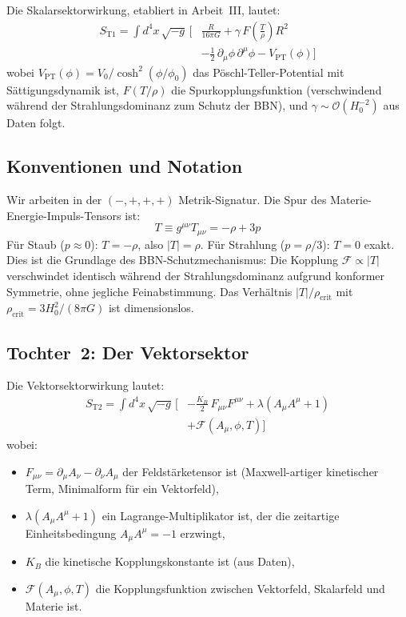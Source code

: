 \documentclass[aps,prd,twocolumn,superscriptaddress,nofootinbib]{revtex4-2}
\begin{document}
Die Skalarsektorwirkung, etabliert in Arbeit~III, lautet:
\begin{align}
S_{\mathrm{T1}} = \int d^4x\,\sqrt{-g}\,\bigg[&
  \frac{R}{16\pi G}
  + \gamma\,F\!\left(\frac{T}{\rho}\right) R^2
\nonumber \\
  &- \frac{1}{2}\,\partial_\mu\phi\,\partial^\mu\phi
  - V_{\mathrm{PT}}(\phi)
\bigg]
\label{eq:S_T1}
\end{align}
wobei $V_{\mathrm{PT}}(\phi) = V_0/\cosh^2(\phi/\phi_0)$ das P\"oschl-Teller-Potential mit S\"attigungsdynamik ist, $F(T/\rho)$ die Spurkopplungsfunktion (verschwindend w\"ahrend der Strahlungsdominanz zum Schutz der BBN), und $\gamma \sim \mathcal{O}(H_0^{-2})$ aus Daten folgt.

\subsection{Konventionen und Notation}
\label{sec:conventions}

Wir arbeiten in der $(-,+,+,+)$ Metrik-Signatur. Die Spur des Materie-Energie-Impuls-Tensors ist:
\begin{equation}
T \equiv g^{\mu\nu}T_{\mu\nu} = -\rho + 3p
\label{eq:trace_def}
\end{equation}
F\"ur Staub ($p \approx 0$): $T = -\rho$, also $|T| = \rho$. F\"ur Strahlung ($p = \rho/3$): $T = 0$ exakt. Dies ist die Grundlage des BBN-Schutzmechanismus: Die Kopplung $\mathcal{F} \propto |T|$ verschwindet identisch w\"ahrend der Strahlungsdominanz aufgrund konformer Symmetrie, ohne jegliche Feinabstimmung. Das Verh\"altnis $|T|/\rho_{\mathrm{crit}}$ mit $\rho_{\mathrm{crit}} = 3H_0^2/(8\pi G)$ ist dimensionslos.

\subsection{Tochter~2: Der Vektorsektor}
\label{sec:vector_action}

Die Vektorsektorwirkung lautet:
\begin{align}
S_{\mathrm{T2}} = \int d^4x\,\sqrt{-g}\,\bigg[&
  -\frac{K_B}{2}\,F_{\mu\nu}F^{\mu\nu}
  + \lambda\!\left(A_\mu A^\mu + 1\right)
\nonumber \\
  &+ \mathcal{F}(A_\mu, \phi, T)
\bigg]
\label{eq:S_T2}
\end{align}
wobei:
\begin{itemize}
\item $F_{\mu\nu} = \partial_\mu A_\nu - \partial_\nu A_\mu$ der Feldst\"arketensor ist (Maxwell-artiger kinetischer Term, Minimalform f\"ur ein Vektorfeld),
\item $\lambda(A_\mu A^\mu + 1)$ ein Lagrange-Multiplikator ist, der die zeitartige Einheitsbedingung $A_\mu A^\mu = -1$ erzwingt,
\item $K_B$ die kinetische Kopplungskonstante ist (aus Daten),
\item $\mathcal{F}(A_\mu, \phi, T)$ die Kopplungsfunktion zwischen Vektorfeld, Skalarfeld und Materie ist.
\end{itemize}
\end{document}
